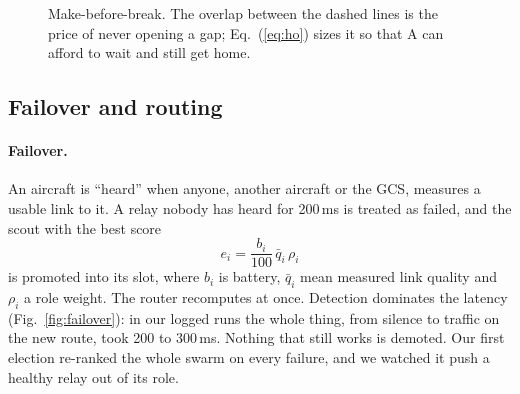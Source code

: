\documentclass[10pt,a4paper,twocolumn]{article}
\begin{document}
\begin{figure}[t]
\centering
{}
\caption{Make-before-break. The overlap between the dashed lines is the price of never opening a gap; Eq.~(\ref{eq:ho}) sizes it so that A can afford to wait and still get home.}
\label{fig:handover}
\end{figure}

\subsection{Failover and routing}
\paragraph{Failover.} An aircraft is ``heard'' when anyone, another aircraft or the GCS, measures a usable link to it. A relay nobody has heard for 200\,ms is treated as failed, and the scout with the best score
\begin{equation}
e_i=\frac{b_i}{100}\,\bar q_i\,\rho_i
\label{eq:elect}
\end{equation}
is promoted into its slot, where $b_i$ is battery, $\bar q_i$ mean measured link quality and $\rho_i$ a role weight. The router recomputes at once. Detection dominates the latency (Fig.~\ref{fig:failover}): in our logged runs the whole thing, from silence to traffic on the new route, took 200 to 300\,ms. Nothing that still works is demoted. Our first election re-ranked the whole swarm on every failure, and we watched it push a healthy relay out of its role.
\end{document}
